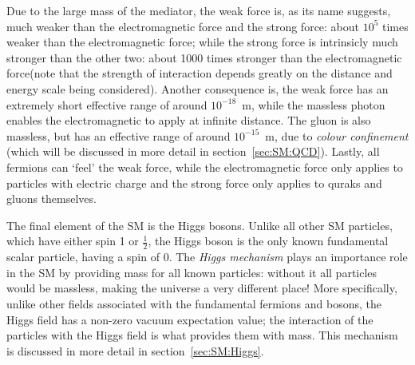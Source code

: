 Due to the large mass of the mediator, the weak force is, as its name suggests, much weaker than the electromagnetic force
and the strong force: about $10^5$ times weaker than the electromagnetic force;
while the strong force is intrinsicly much stronger than the other two: about 1000 times stronger
than the electromagnetic force(note that the strength of interaction
depends greatly on the distance and energy scale being considered).
Another consequence is, 
the weak force has an extremely short effective range of around $10^{-18}$~m, 
while the massless photon enables the electromagnetic to apply at infinite distance. 
The gluon is also massless, but has an effective range of around $10^{-15}$~m, due
to \textit{colour confinement} 
(which will be discussed in more detail in section~\ref{sec:SM:QCD}). 
Lastly, all fermions can `feel' the weak force, while the electromagnetic force only 
applies to particles with electric charge and the strong force only applies to quraks and
gluons themselves. 


The final element of the SM is the Higgs bosons.
Unlike all other SM particles, which have either spin 1 or $\frac{1}{2}$, 
the Higgs boson is the only known fundamental scalar particle, having a spin of 0.
The \textit{Higgs mechanism} plays an importance role in the SM
by providing mass for all known particles: without it all particles would be massless, 
making the universe a very different place!
More specifically, unlike other fields associated with the fundamental fermions and bosons, 
the Higgs field has a non-zero vacuum expectation
value; the interaction of the particles with the Higgs field is what provides them with mass. 
This mechanism is discussed in more detail in section~\ref{sec:SM:Higgs}.


